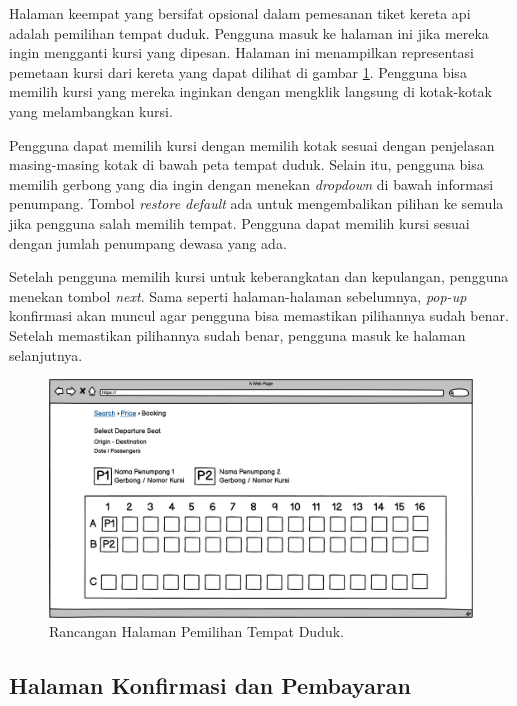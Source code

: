 Halaman keempat yang bersifat opsional dalam pemesanan tiket kereta api adalah pemilihan tempat duduk. Pengguna masuk ke halaman ini jika mereka ingin mengganti kursi yang dipesan. Halaman ini menampilkan representasi pemetaan kursi dari kereta yang dapat dilihat di gambar \ref{img:rancanganpilihkursi}. Pengguna bisa memilih kursi yang mereka inginkan dengan mengklik langsung di kotak-kotak yang melambangkan kursi.

Pengguna dapat memilih kursi dengan memilih kotak sesuai dengan penjelasan masing-masing kotak di bawah peta tempat duduk. Selain itu, pengguna bisa memilih gerbong yang dia ingin dengan menekan \textit{dropdown} di bawah informasi penumpang. Tombol \textit{restore default} ada untuk mengembalikan pilihan ke semula jika pengguna salah memilih tempat. Pengguna dapat memilih kursi sesuai dengan jumlah penumpang dewasa yang ada.

Setelah pengguna memilih kursi untuk keberangkatan dan kepulangan, pengguna menekan tombol \textit{next}. Sama seperti halaman-halaman sebelumnya, \textit{pop-up} konfirmasi akan muncul agar pengguna bisa memastikan pilihannya sudah benar. Setelah memastikan pilihannya sudah benar, pengguna masuk ke halaman selanjutnya.

\begin{figure}[H]
\center
\includegraphics[width=\textwidth,height=\textheight,keepaspectratio]{Gambar/Halaman Pemilihan Tempat Duduk.png}
\caption{Rancangan Halaman Pemilihan Tempat Duduk.}
    \label{img:rancanganpilihkursi}
\end{figure}

\subsection{Halaman Konfirmasi dan Pembayaran}
\label{subsec:rancangankonfirmasi}

